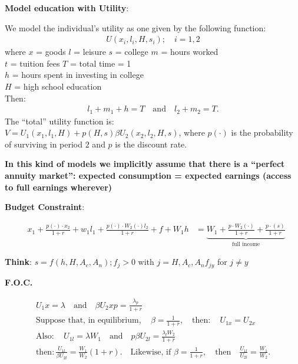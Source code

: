 \documentclass[14pt,notitlepage]{article}
\begin{document}
\textbf{Model education with Utility}:

We model the individual's utility as one given by the following function:
\begin{align*}
U(x_i, l_i, H, s_i); \quad i = 1,2
\end{align*}
where $x$ = goods \quad $l$ = leisure \quad $s$ = college \quad $m$ = hours worked \\
$t$ = tuition fees \quad $T$ = total time = 1 \\
$h$ = hours spent in investing in college \\
$H$ = high school education \\
Then:
\begin{align*}
l_1 + m_1 + h = T \quad \text{and} \quad l_2 + m_2 = T.
\end{align*}
The ``total'' utility function is: \\
$V = U_1(x_1, l_1, H) + p(H,s) \beta U_2(x_2, l_2, H, s)$, where $p(\cdot)$ is the probability of surviving in period $2$ and $p$ is the discount rate.

\textbf{In this kind of models we implicitly assume that there is a ``perfect annuity market'': expected consumption = expected earnings (access to full earnings wherever)}

\textbf{Budget Constraint}:

\begin{align*}
&x_1 + \frac{p(\cdot)\cdot x_2}{1+r} + w_1 l_1 + \frac{p(\cdot)\cdot W_2(\cdot)l_2}{1+r} + f + W_1 h
&= \underbrace{W_1 + \frac{p \cdot W_2 (\cdot)}{1+r} + \frac{p \cdot (s)}{1+r}}_{\text{full income}}
\end{align*}

\textbf{Think}: \quad $s = f(h, H, A_c, A_n); f_j > 0$ with $j = H, A_c, A_n f_{jy}$ for $j \neq y$

\textbf{F.O.C.}

\begin{align*}
U_1 x = \lambda \quad \text{and} \quad \beta U_2 x p = \frac{\lambda_p}{1+r} \\
\text{Suppose that, in equilibrium}, \quad \beta = \frac{1}{1+r}, \quad \text{then}: \quad U_{1x} = U_{2x} \\
\text{Also}: \quad U_{1l} = \lambda W_1 \quad \text{and} \quad p \beta U_{2l} = \frac{\lambda_l W_2}{1+r} \\
\text{then}: \frac{U_{1l}}{\beta U_{2l}} = \frac{W_1}{W_2} (1+r). \quad \text{Likewise, if } \beta = \frac{1}{1+r}, \quad \text{then} \quad \frac{U_{1l}}{U_{2l}} = \frac{W_1}{W_2}.
\end{align*}
\end{document}
